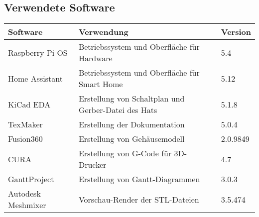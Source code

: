 \subsection{Verwendete Software}\label{qu_software}
\begin{tabularx}{\textwidth}{|p{5cm}|p{6cm}|p{3.2cm}|}
 	\hline 
 	\textbf{Software} & \textbf{Verwendung} & \textbf{Version} \\ 
 	\hline 
 	Raspberry Pi OS & Betriebssystem und Oberfläche für Hardware & 5.4 \\ 
 	\hline 
 	Home Assistant & Betriebssystem und Oberfläche für Smart Home & 5.12 \\ 
 	\hline 
 	KiCad EDA & Erstellung von Schaltplan und Gerber-Datei des Hats & 5.1.8 \\ 
 	\hline 
 	TexMaker & Erstellung der Dokumentation & 5.0.4 \\ 
 	\hline 
 	Fusion360 & Erstellung von Gehäusemodell & 2.0.9849 \\ 
 	\hline
 	CURA & Erstellung von G-Code für 3D-Drucker & 4.7 \\ 
 	\hline
 	GanttProject & Erstellung von Gantt-Diagrammen & 3.0.3 \\ 
 	\hline
 	Autodesk Meshmixer & Vorschau-Render der STL-Dateien & 3.5.474 \\
 	\hline
\end{tabularx} 